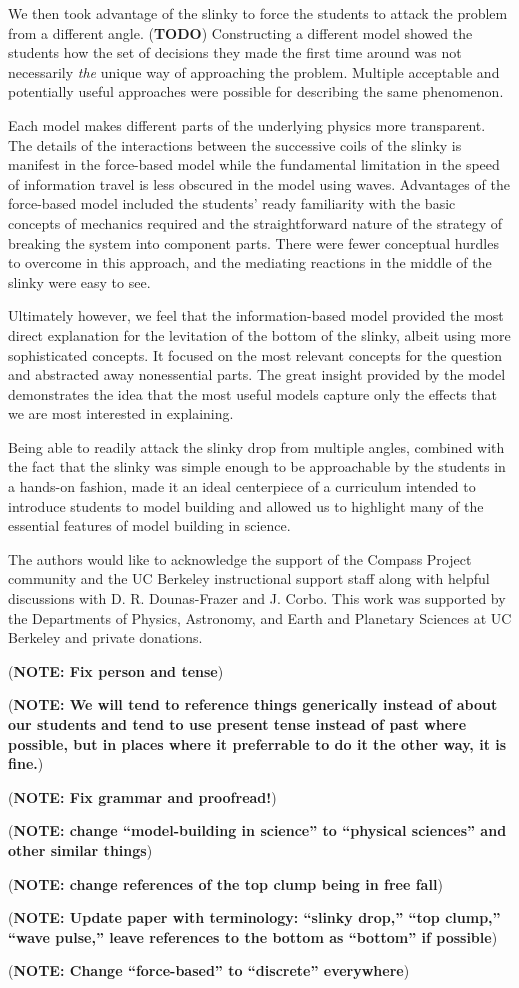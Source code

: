 \documentclass[prb,preprint,superscriptaddress]{revtex4-1}
\newcommand{\TODO}[1]{\marginpar{\raggedright\scriptsize\textbf{TODO:} #1} (\textbf{TODO})}
\newcommand{\NOTE}[1]{\marginpar{\footnotesize\textbf{NOTE}} (\textbf{NOTE: #1})}
\begin{document}
We then took advantage of the slinky to force the students to attack the problem
from a different angle.\TODO{Reword this sentence} Constructing a different model showed the students
how the set of decisions they made the first time around was not necessarily
\emph{the} unique way of approaching the problem. Multiple acceptable and potentially
useful approaches were possible for describing the same phenomenon.

Each model makes different parts of the underlying physics
more transparent. The details of the interactions between the successive coils
of the slinky is manifest in the force-based model while the fundamental
limitation in the speed of information travel is less obscured in the model
using waves. Advantages of the force-based model included the students' ready
familiarity with the basic concepts of mechanics required and the straightforward
nature of the strategy of breaking the system into component parts. There were
fewer conceptual hurdles to overcome in this approach, and the mediating
reactions in the middle of the slinky were easy to see. 

Ultimately however, we feel that the information-based model provided the
most direct explanation for the levitation of the bottom of the slinky, albeit
using more sophisticated concepts. It focused
on the most relevant concepts for the question and abstracted away
nonessential parts. The great insight provided by the
model demonstrates the idea that the most useful models
capture only the effects that we are most interested in explaining.

Being able to readily attack the slinky drop from multiple angles, combined with
the fact that the slinky was simple enough to be approachable by the students
in a hands-on fashion, made it an ideal centerpiece of a curriculum intended to
introduce students to model building and allowed us to highlight many of the
essential features of model building in science.


\acknowledgments The authors would like to acknowledge the support of the Compass
Project community and the UC Berkeley instructional support staff along with
helpful discussions with D. R. Dounas-Frazer and J. Corbo.
This work was supported by the Departments of Physics, Astronomy, and Earth and
Planetary Sciences at UC Berkeley and private donations.

\NOTE{Fix person and tense}

\NOTE{We will tend to reference things generically instead of about our students and tend to use present tense instead of past where possible, but in places where it preferrable to do it the other way, it is fine.}

\NOTE{Fix grammar and proofread!}

\NOTE{change ``model-building in science'' to ``physical sciences'' and other similar things}

\NOTE{change references of the top clump being in free fall}

\NOTE{Update paper with terminology: ``slinky drop,'' ``top clump,'' ``wave pulse,'' leave references to the bottom as ``bottom'' if possible}

\NOTE{Change ``force-based'' to ``discrete'' everywhere}


\end{document}
